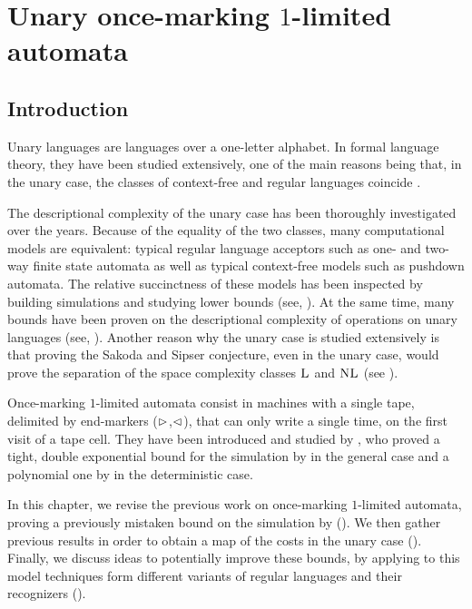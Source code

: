 \chapter{Unary once-marking \texorpdfstring{$1$}{1}-limited automata}



\section{Introduction}
Unary languages are languages over a one-letter alphabet.
In formal language theory, they have been studied extensively, one of the main reasons being that, in the unary case, the classes of context-free and regular languages coincide \cite{GinRic62}.

The descriptional complexity of the unary case has been thoroughly investigated over the years.
Because of the equality of the two classes, many computational models are equivalent: typical regular language acceptors such as one- and two-way finite state automata as well as typical context-free models such as pushdown automata.
The relative succinctness of these models has been inspected by building simulations and studying lower bounds (see, \eg[,] \cite{GefMer+03,MerPig01,Pig08,PigSha+02}).
At the same time, many bounds have been proven on the descriptional complexity of operations on unary languages (see, \eg[,] \cite{HolKut03,KunOkh12,MerPig05,PigSha02}).
Another reason why the unary case is studied extensively is that proving the Sakoda and Sipser conjecture, even in the unary case, would prove the separation of the space complexity classes $\textsc{L}$ and $\textsc{NL}$ (see ).

Once-marking $1$-limited automata consist in machines with a single tape, delimited by end-markers ($\rhd$,$\lhd$), that can only write a single time, on the first visit of a tape cell.
They have been introduced and studied by \citeauthor{PigPri23a}, who proved a tight, double exponential bound for the simulation by \ODFAs in the general case and a polynomial one by \TDFA in the deterministic case.

In this chapter, we revise the previous work on once-marking $1$-limited automata, proving a previously mistaken bound on the simulation by \NFA ().
We then gather previous results in order to obtain a map of the costs in the unary case ().
Finally, we discuss ideas to potentially improve these bounds, by applying to this model techniques form different variants of regular languages and their recognizers ().



